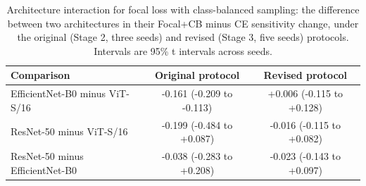 \begin{table}[t]
\centering
\small
\caption{Architecture interaction for focal loss with class-balanced sampling: the difference between two architectures in their Focal+CB minus CE sensitivity change, under the original (Stage 2, three seeds) and revised (Stage 3, five seeds) protocols. Intervals are 95\% t intervals across seeds.}
\label{tab:interaction}
\begin{tabular}{lcc}
\toprule
Comparison & Original protocol & Revised protocol \\
\midrule
EfficientNet-B0 minus ViT-S/16 & -0.161 (-0.209 to -0.113) & +0.006 (-0.115 to +0.128) \\
ResNet-50 minus ViT-S/16 & -0.199 (-0.484 to +0.087) & -0.016 (-0.115 to +0.082) \\
ResNet-50 minus EfficientNet-B0 & -0.038 (-0.283 to +0.208) & -0.023 (-0.143 to +0.097) \\
\bottomrule
\end{tabular}
\end{table}
